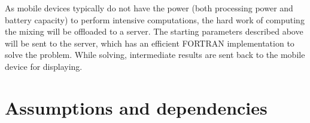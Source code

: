 As mobile devices typically do not have the power (both processing power and battery capacity) to perform intensive computations, the hard work of computing the mixing will be offloaded to a server. The starting parameters described above will be sent to the server, which has an efficient FORTRAN implementation to solve the problem. While solving, intermediate results are sent back to the mobile device for displaying.

\section{Assumptions and dependencies}
